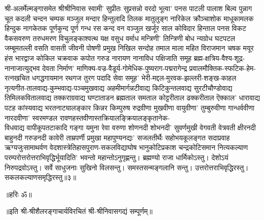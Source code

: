 \begin{flushleft}
श्री-अलर्मेल्मङ्गासमेत श्रीश्रीनिवास स्वामी' सुप्रीतः सुप्रसन्नो वरदो
भूत्वा' पनस पाटली पालाश बिल्व पुन्नाग चूत कदली चन्दन
चम्पक मञ्जुल मन्दार हिन्तुलादि तिलक मातुलुङ्ग नारिकेल
क्रौञ्चाशोक माधूकामलक हिन्दुक नागकेतक पूर्णकुन्द पूर्ण गन्ध रस
कन्द वन वञ्जुल खर्जूर साल कोविदार हिन्ताल पनस विकट
वैकसवरुण तरुधमरण विचुलङ्काश्वत्थ यक्ष वसुध वर्माध मन्त्रिणी'
तिन्त्रिणी बोध न्यग्रोध घटपटल जम्बूमतल्ली वसति वासती जीवनी
पोषणी प्रमुख निखिल सन्दोह तमाल माला महित विराजमान चषक
मयूर हंस भारद्वाज कोकिल चक्रवाक कपोत गरुड नारायण नानाविध पक्षिजाति समूह ब्रह्म-क्षत्रिय-वैश्य-शूद्र-नानाजात्युद्भव देवता
निर्माण' माणिक्य-वज्र-वैडूर्य-गोमेधिक-पुष्यराग-पद्मरागेन्द्र प्रवालमौक्तिक-स्फटिक-हेम-रत्नखचित धगद्धगायमान रथगज
तुरग पदादि सेवा समूह' भेरी-मद्दल-मुरवक-झल्लरी-शङ्ख-काहल नृत्यगीत-तालवाद्य-कुम्भवाद्य-पञ्चमुखवाद्य अहमीमार्गन्नटीवाद्य किटिकुन्तलवाद्य सुरटीचौण्डोवाद्य तिमिलकवितालवाद्य
तक्कराग्रवाद्य घण्टाताडन ब्रह्मताल समताल कोट्टरीताल ढक्करीताल ऎक्काल' धारावाद्य पटह कांस्यवाद्य भरतनाट्यालङ्कार किन्नर किम्पुरुष
रुद्रवीणा मुखवीणा वायुवीणा' तुम्बुरुवीणा गान्धर्ववीणा नारदवीणा' स्वरमण्डल रावणहस्तवीणास्तक्रियालङ्क्रियालङ्कृतानेक-\\विधवाद्य वापीकूपतटाकादि गङ्गा यमुना रेवा वरुणा शोणनदी शोभनदी'
सुवर्णमुखी वेगवती वेत्रवती क्षीरनदी बाहुनदी गरुडनदी कावेरी ताम्रपर्णी प्रमुखा महापुण्यनद्यः' सजलतीर्थैः सहोभयकूलङ्गत सदाप्रवाह ऋग्यजुःसामाथर्वण वेदशास्त्रेतिहासपुराण-सकलविद्याघोष भानुकोटिप्रकाश चन्द्रकोटिसमान नित्यकल्याण परम्परोत्तरोत्तराभिवृद्धिर्भूयादिति' भवन्तो महान्तोऽनुगृह्णन्तु। 
ब्रह्मण्यो राजा धार्मिकोऽस्तु। देशोऽयं निरुपद्रवोऽस्तु।
सर्वे साधुजनाः सुखिनो विलसन्तु। समस्तसन्मङ्गलानि सन्तु। उत्तरोत्तराभिवृद्धिरस्तु। सकलकल्याणसमृद्धिरस्तु॥३॥
\centerline{॥हरिः ॐ॥}
\centerline{॥इति श्री-श्रीशैलरङ्गाचार्यविरचितं श्री-श्रीनिवासगद्यं सम्पूर्णम्॥}
\end{flushleft}